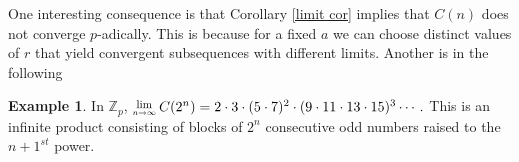 \documentclass[a0]{a0poster}
\newtheorem{proposition}{Proposition}
\theoremstyle{definition}
\newtheorem{example}{Example}
\newcommand{\Lim}[1]{\raisebox{0.5ex}{\scalebox{0.8}{$\displaystyle \lim_{#1}\;$}}}
\newcommand{\coref}[1]{Corollary \ref{#1}}
\begin{document}
\begin{textblock}{7}
One interesting consequence is that \coref{limit cor} implies that $C(n)$ does not converge $p$-adically. This is because for a fixed $a$ we can choose distinct values of $r$ that yield convergent subsequences with different limits. Another is in the following

\begin{example}
In $\mathbb{Z}_p$, $\Lim{n\rightarrow\infty}C(2^n)=2\cdot3\cdot(5\cdot7)^2\cdot(9\cdot11\cdot13\cdot15)^3\cdots.$ This is an infinite product consisting of blocks of $2^n$ consecutive odd numbers raised to the $n+1^{st}$ power.
\end{example}





\end{textblock}
\end{document}
